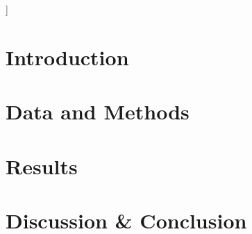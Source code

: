 \documentclass{article}
\begin{document}

\vskip 0.3in
]



\printAffiliationsAndNotice{\icmlEqualContribution} %

\begin{abstract}

\end{abstract}

% 
% 
% 
% 

\section{Introduction}\label{sec:introduction}


\section{Data and Methods}\label{sec:methods}





\section{Results}\label{sec:results}



\section{Discussion \& Conclusion}\label{sec:conclusion}

\end{document}
